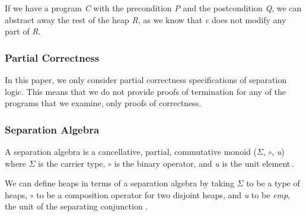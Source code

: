 \begin{prooftree}
\end{prooftree}

If we have a program {\it C} with the precondition {\it P} and the postcondition {\it Q}, we can abstract away the rest of the heap {\it R}, as we know that {\it c} does not modify any part of {\it R}.

\subsubsection{Partial Correctness}
In this paper, we only consider partial correctness specifications of separation logic. This means that we do not provide proofs of termination for any of the programs that we examine, only proofs of correctness.


\subsubsection{Separation Algebra}
A separation algebra is a cancellative, partial, commutative monoid ($\Sigma$, $\circ$, {\it u}) where $\Sigma$ is the carrier type, $\circ$ is the binary operator, and {\it u} is the unit element\,\cite{Calcagno07:LCS}.

We can define heaps in terms of a separation algebra by taking $\Sigma$ to be a type of heaps, $\circ$ to be a composition operator for two disjoint heaps, and {\it u} to be {\it emp}, the unit of the separating conjunction \cite{BirkedalL:veroop-conf}.

